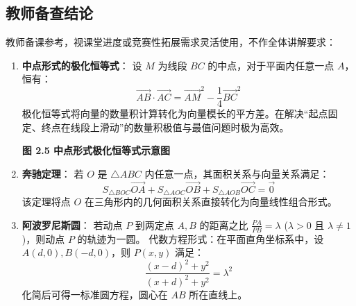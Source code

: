 \documentclass[11pt,a4paper]{ctexart}
\begin{document}
\subsection{教师备查结论}
教师备课参考，视课堂进度或竞赛性拓展需求灵活使用，不作全体讲解要求：

\begin{enumerate}[label=\arabic*. , leftmargin=2em, itemsep=1.2em, topsep=0.2em]
  \item \textbf{中点形式的极化恒等式}：
  设 $M$ 为线段 $BC$ 的中点，对于平面内任意一点 $A$，恒有：
  \[
  \vec{AB} \cdot \vec{AC} = \vec{AM}^2 - \frac{1}{4}\vec{BC}^2
  \]
  极化恒等式将向量的数量积计算转化为向量模长的平方差。在解决“起点固定、终点在线段上滑动”的数量积极值与最值问题时极为高效。
  \begin{center}
    \par\vspace{0.2em}
    {\small\textbf{图 2.5 中点形式极化恒等式示意图}}
  \end{center}

  \item \textbf{奔驰定理}：
  若 $O$ 是 $\triangle ABC$ 内任意一点，其面积关系与向量关系满足：
  \[
  S_{\triangle BOC}\vec{OA} + S_{\triangle AOC}\vec{OB} + S_{\triangle AOB}\vec{OC} = \vec{0}
  \]
  该定理将点 $O$ 在三角形内的几何面积关系直接转化为向量线性组合形式。
  
  \item \textbf{阿波罗尼斯圆}：
  若动点 $P$ 到两定点 $A, B$ 的距离之比 $\frac{PA}{PB} = \lambda$ ($\lambda > 0$ 且 $\lambda \neq 1$)，则动点 $P$ 的轨迹为一圆。
  代数方程形式：在平面直角坐标系中，设 $A(d, 0), B(-d, 0)$，则 $P(x,y)$ 满足：
  \[
  \frac{(x-d)^2+y^2}{(x+d)^2+y^2} = \lambda^2
  \]
  化简后可得一标准圆方程，圆心在 $AB$ 所在直线上。
\end{enumerate}

\newpage
\end{document}
